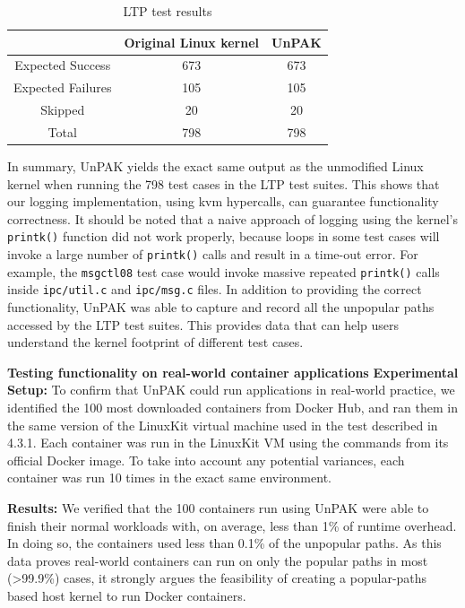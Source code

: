 \begin{table}
\begin{center}
\caption{LTP test results}
\label{tab:evaluation_ltp_results}
\begin{tabular}{c|c|c}
 & Original Linux kernel & UnPAK \\
 \hline
 Expected Success & 673 & 673 \\
 \hline
 Expected Failures & 105 & 105 \\
 \hline
 Skipped & 20 & 20 \\
 \hline
 Total & 798 & 798 \\ 
\end{tabular}
\end{center}
\end{table}

In summary, UnPAK yields the exact same output as the unmodified Linux kernel when running the 798 test cases in the LTP test suites. 
This shows that our logging implementation, using kvm hypercalls, can guarantee functionality correctness. 
It should be noted that a naive approach of logging using the kernel's \texttt{printk()} function did not work properly, 
because loops in some test cases will invoke a large number of \texttt{printk()} calls and result in a time-out error. 
For example, the \texttt{msgctl08} test case would invoke massive repeated \texttt{printk()} calls inside \texttt{ipc/util.c} and \texttt{ipc/msg.c} files. 
In addition to providing the correct functionality, UnPAK was able to capture and record all the unpopular paths accessed by the LTP test suites. 
This provides data that can help users understand the kernel footprint of different test cases. 

\noindent
\textbf{Testing functionality on real-world container applications} 
\newline
\textbf{Experimental Setup:} To confirm that UnPAK could run applications in real-world practice, we identified the 100 most downloaded containers from Docker Hub, 
and ran them in the same version of the LinuxKit virtual machine used in the test described in 4.3.1. 
Each container was run in the LinuxKit VM using the commands from its official Docker image. 
To take into account any potential variances, each container was run 10 times in the exact same environment.

\textbf{Results:} We verified that the 100 containers run using UnPAK were able to finish their normal workloads with, on average, less than 1\% of runtime overhead. 
In doing so, the containers used less than 0.1\% of the unpopular paths. As this data proves real-world containers can run on only the popular paths in most (>99.9\%) cases, 
it strongly argues the feasibility of creating a popular-paths based host kernel to run Docker containers.  

